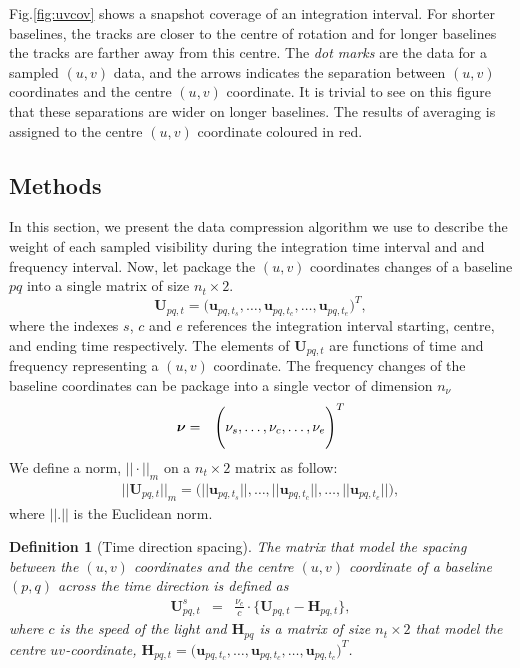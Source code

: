 \documentclass[useAMS,usenatbib]{mn2e}
\newtheorem{definition}[theorem]{Definition}
\begin{document}
Fig.\ref{fig:uvcov} shows a snapshot coverage of an integration interval. For shorter baselines, the tracks are closer to the centre of 
rotation and for longer baselines the tracks are farther away from this centre. The \textit{dot marks} are the data for a sampled $(u,v)$ 
data, and the  arrows indicates the separation between $(u,v)$ coordinates and the centre $(u,v)$ coordinate. It is trivial to see on this 
figure that these separations are wider on longer baselines. The results of averaging is assigned to the centre $(u,v)$ coordinate coloured 
in red. 
\subsection{Methods}
In this section, we present the data compression algorithm we use to describe the weight of each sampled visibility during the 
integration time interval and and frequency interval. Now, let package the $(u,v)$ coordinates changes of a baseline $pq$ into a single 
matrix of size $n_t \times 2$.
\begin{equation}
\mathbf{U}_{pq,t}= \Bigg(\mathbf{u}_{pq,t_s}, \dots , \mathbf{u}_{pq,t_c}, \dots, \mathbf{u}_{pq,t_e}\Bigg)^T,
\end{equation}
where the indexes $s$, $c$ and $e$ references the integration interval starting, centre, and ending time respectively. The 
elements of $\mathbf{U}_{pq,t}$ are functions of time and frequency representing a $(u,v)$ coordinate. The frequency changes of the 
baseline coordinates can be package into a single vector of dimension $n_{\nu}$ 
\begin{eqnarray*}
 \mbox{\boldmath $\nu$}&=&\Bigg(\nu_s,\dots,\nu_c,\dots,\nu_e\Bigg)^T
\end{eqnarray*}
We define a norm, $||\cdot||_{m}$ on a $n_t \times 2$ matrix as follow:
\begin{eqnarray}
||\textbf{U}_{pq,t}||_{m}=\Bigg(||\mathbf{u}_{pq,t_s}||, \dots , ||\mathbf{u}_{pq,t_c}||, \dots, ||\mathbf{u}_{pq,t_e}||\Bigg),
\end{eqnarray}
where $||.||$ is the Euclidean norm.
\begin{definition}[Time direction spacing]
\label{def:1}
The matrix that model the spacing between the $(u,v)$ coordinates and the centre $(u,v)$ coordinate of a baseline $(p,q)$ across the time 
direction is defined as
\begin{eqnarray*}
 \mathbf{U}_{pq,t}^{s} &=&\frac{\nu_c}{c}\cdot\Bigg\{\mathbf{U}_{pq,t}-\mathbf{H}_{pq,t} \Bigg \},
\end{eqnarray*}
where $c$ is the speed of the light and $\mathbf{H}_{pq}$ is a matrix of size $n_t \times 2$ that model the centre $uv$-coordinate,
$\mathbf{H}_{pq,t}= \big(\mathbf{u}_{pq,t_c}, \dots , \mathbf{u}_{pq,t_c}, \dots, \mathbf{u}_{pq,t_c}\big)^T$.
\end{definition}
\end{document}
